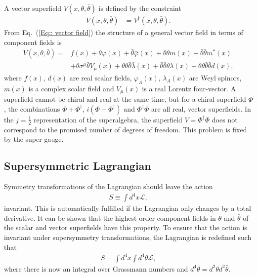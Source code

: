 \documentclass[twoside,english]{uiofysmaster}
\begin{document}
A vector superfield $V(x, \theta, \bar{\theta})$ is defined by the constraint
\begin{align}
V (x, \theta, \bar{\theta}) &= V^{\dagger} (x, \theta, \bar{\theta}).\label{Eq:: vector field}
\end{align}
From Eq.\ (\ref{Eq:: vector field}) the structure of a general vector field in terms of component fields is \cite{martin2010supersymmetry}
\begin{align}
V (x, \theta, \bar{\theta}) =& f(x) + \theta \varphi (x) + \bar{\theta} \bar{\varphi} (x) + \theta \theta m(x) + \bar{\theta} \bar{\theta} m^* (x) \nonumber \\
&+ \theta \sigma^{\mu} \bar{\theta} V_{\mu} (x) + \theta \theta \bar{\theta} \bar{\lambda} (x) + \bar{\theta} \bar{\theta} \theta \lambda (x) + \theta \theta \bar{\theta} \bar{\theta} d(x),
\end{align}
where $f(x)$, $d(x)$ are real scalar fields, $\varphi_A (x)$, $\lambda_A (x)$ are Weyl spinors, $m(x)$ is a complex scalar field and $V_{\mu} (x)$ is a real Lorentz four-vector. A superfield cannot be chiral and real at the same time, but for a chiral superfield $\Phi$, the combinations $\Phi + \Phi^{\dagger}$, $i (\Phi - \Phi^{\dagger})$ and $\Phi^{\dagger} \Phi$ are all real, vector superfields. In the $j = \frac{1}{2}$ representation of the superalgebra, the superfield $V = \Phi^{\dagger} \Phi$ does not correspond to the promised number of degrees of freedom. This problem is fixed by the super-gauge. 



\subsection{Supersymmetric Lagrangian}

Symmetry transformations of the Lagrangian should leave the action
\begin{align}
S \equiv \int d^4x \mathcal{L},
\end{align}
 invariant. This is automatically fulfilled if the Lagrangian only changes by a total derivative. It can be shown that the highest order component fields in $\theta$ and $\bar{\theta}$ of the scalar and vector superfields have this property. To ensure that the action is invariant under supersymmetry transformations, the Lagrangian is redefined such that
\begin{align}
S = \int d^4x \int d^4 \theta \mathcal{L},
\end{align}
where there is now an integral over Grassmann numbers and $d^4 \theta = d^2 \theta d^2 \bar{\theta}$.
\end{document}

